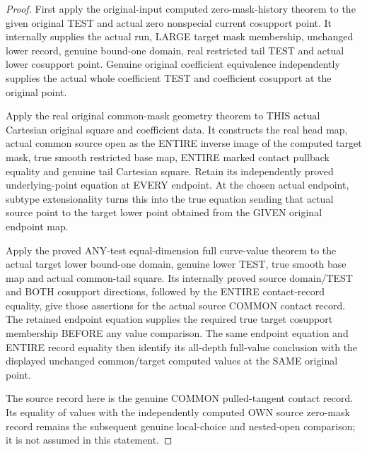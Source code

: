 \begin{proof}
First apply the original-input computed zero-mask-history theorem to the
given original TEST and actual zero nonspecial current cosupport point.
It internally supplies the actual run, LARGE target mask membership,
unchanged lower record, genuine bound-one domain, real restricted tail
TEST and actual lower cosupport point. Genuine original coefficient
equivalence independently supplies the actual whole coefficient TEST
and coefficient cosupport at the original point.

Apply the real original common-mask geometry theorem to THIS actual
Cartesian original square and coefficient data. It constructs the real
head map, actual common source open as the ENTIRE inverse image of the
computed target mask, true smooth restricted base map, ENTIRE marked
contact pullback equality and genuine tail Cartesian square. Retain its
independently proved underlying-point equation at EVERY endpoint. At
the chosen actual endpoint, subtype extensionality turns this into the
true equation sending that actual source point to the target lower
point obtained from the GIVEN original endpoint map.

Apply the proved ANY-test equal-dimension full curve-value theorem to
the actual target lower bound-one domain, genuine lower TEST, true
smooth base map and actual common-tail square. Its internally proved
source domain/TEST and BOTH cosupport directions, followed by the
ENTIRE contact-record equality, give those assertions for the actual
source COMMON contact record. The retained endpoint equation supplies
the required true target cosupport membership BEFORE any value
comparison. The same endpoint equation and ENTIRE record equality then
identify its all-depth full-value conclusion with the displayed
unchanged common/target computed values at the SAME original point.

The source record here is the genuine COMMON pulled-tangent contact
record. Its equality of values with the independently computed OWN
source zero-mask record remains the subsequent genuine local-choice
and nested-open comparison; it is not assumed in this statement.
\end{proof}

